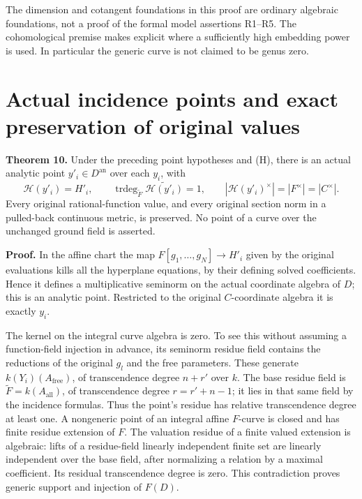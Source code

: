 \documentclass[
  11pt,
]{article}
\begin{document}
The dimension and cotangent foundations in this proof are ordinary
algebraic foundations, not a proof of the formal model assertions
R1--R5. The cohomological premise makes explicit where a sufficiently
high embedding power is used. In particular the generic curve is not
claimed to be genus zero.

\section{Actual incidence points and exact preservation of original
values}\label{actual-incidence-points-and-exact-preservation-of-original-values}

\textbf{Theorem 10.} Under the preceding point hypotheses and (H), there
is an actual analytic point \(y'_i\in D^{\mathrm{an}}\) over each
\(y_i\), with \[
 \mathcal H(y'_i)=H'_i,\qquad
 \operatorname{trdeg}_{\widetilde F}\widetilde{\mathcal H(y'_i)}=1,
 \qquad |\mathcal H(y'_i)^\times|=|F^\times|=|C^\times|.
\] Every original rational-function value, and every original section
norm in a pulled-back continuous metric, is preserved. No point of a
curve over the unchanged ground field is asserted.

\textbf{Proof.} In the affine chart the map
\(F[g_1,\ldots,g_N]\to H'_i\) given by the original evaluations kills
all the hyperplane equations, by their defining solved coefficients.
Hence it defines a multiplicative seminorm on the actual coordinate
algebra of \(D\); this is an analytic point. Restricted to the original
\(C\)-coordinate algebra it is exactly \(y_i\).

The kernel on the integral curve algebra is zero. To see this without
assuming a function-field injection in advance, its seminorm residue
field contains the reductions of the original \(g_l\) and the free
parameters. These generate \(k(Y_i)(A_{\mathrm{free}})\), of
transcendence degree \(n+r'\) over \(k\). The base residue field is
\(\widetilde F=k(A_{\mathrm{all}})\), of transcendence degree
\(r=r'+n-1\); it lies in that same field by the incidence formulas. Thus
the point's residue has relative transcendence degree at least one. A
nongeneric point of an integral affine \(F\)-curve is closed and has
finite residue extension of \(F\). The valuation residue of a finite
valued extension is algebraic: lifts of a residue-field linearly
independent finite set are linearly independent over the base field,
after normalizing a relation by a maximal coefficient. Its residual
transcendence degree is zero. This contradiction proves generic support
and injection of \(F(D)\).
\end{document}
